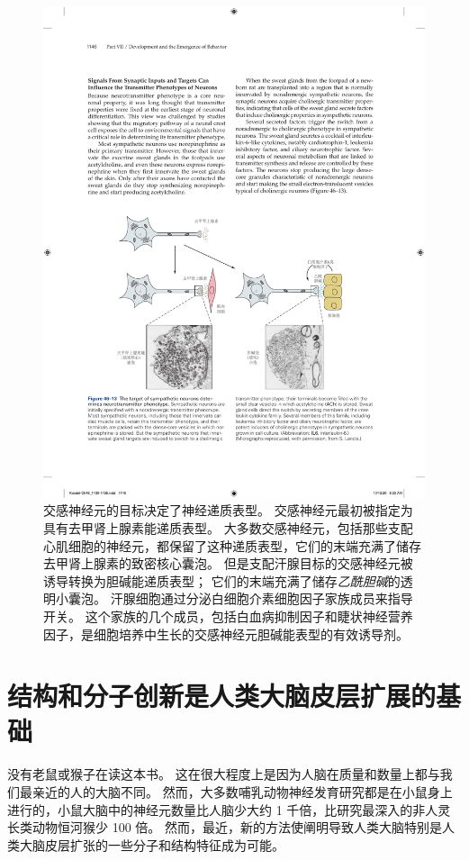 \begin{figure}[htbp]
	\centering
	\includegraphics[width=0.95\linewidth]{chap46/fig_46_13}
	\caption{交感神经元的目标决定了神经递质表型。
		交感神经元最初被指定为具有去甲肾上腺素能递质表型。
		大多数交感神经元，包括那些支配心肌细胞的神经元，都保留了这种递质表型，它们的末端充满了储存去甲肾上腺素的致密核心囊泡。
		但是支配汗腺目标的交感神经元被诱导转换为胆碱能递质表型；
		它们的末端充满了储存\textit{乙酰胆碱}的透明小囊泡。
		汗腺细胞通过分泌白细胞介素细胞因子家族成员来指导开关。
		这个家族的几个成员，包括白血病抑制因子和睫状神经营养因子，是细胞培养中生长的交感神经元胆碱能表型的有效诱导剂。}
	\label{fig:46_13}
\end{figure}



\section{结构和分子创新是人类大脑皮层扩展的基础}

没有老鼠或猴子在读这本书。
这在很大程度上是因为人脑在质量和数量上都与我们最亲近的人的大脑不同。
然而，大多数哺乳动物神经发育研究都是在小鼠身上进行的，小鼠大脑中的神经元数量比人脑少大约 1 千倍，比研究最深入的非人灵长类动物恒河猴少 100 倍。
然而，最近，新的方法使阐明导致人类大脑特别是人类大脑皮层扩张的一些分子和结构特征成为可能。


